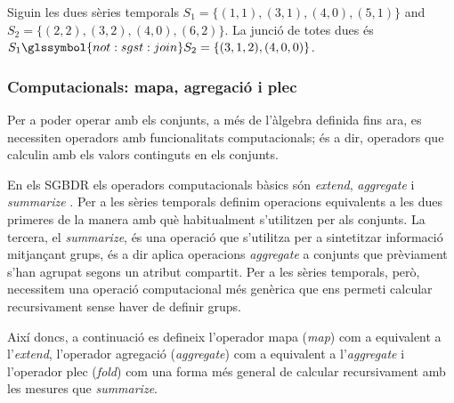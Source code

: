 \begin{example}
  Siguin les dues sèries temporals $S_1=\{(1,1),(3,1),(4,0),(5,1)\}$
  and $S_2=\{(2,2),(3,2),(4,0),(6,2)\}$.  La junció de totes dues és
  $S_1 \glssymbol{not:sgst:join} S_2 = \{(3,1,2),(4,0,0)\}$.
\end{example}



\subsubsection{Computacionals: mapa, agregació i plec}

Per a poder operar amb els conjunts, a més de l'àlgebra definida fins
ara, es necessiten operadors amb funcionalitats computacionals; és a
dir, operadors que calculin amb els valors continguts en els conjunts. 

En els \gls{SGBDR} els operadors computacionals bàsics són
\emph{extend}, \emph{aggregate} i
\emph{summarize} \parencite[cap.~7]{date04:introduction8}.  Per a les
sèries temporals definim operacions equivalents a les dues primeres de
la manera amb què habitualment s'utilitzen per als conjunts.  La
tercera, el \emph{summarize}, és una operació que s'utilitza per a
sintetitzar informació mitjançant grups, és a dir aplica operacions
\emph{aggregate} a conjunts que prèviament s'han agrupat segons un
atribut compartit.  Per a les sèries temporals, però, necessitem una
operació computacional més genèrica que ens permeti calcular
recursivament sense haver de definir grups.




Així doncs, a continuació es defineix l'operador mapa (\emph{map}) com
a equivalent a l'\emph{extend}, l'operador agregació (\emph{aggregate})
com a equivalent a l'\emph{aggregate} i l'operador plec (\emph{fold})
com una forma més general de calcular recursivament amb les mesures
que \emph{summarize}.




